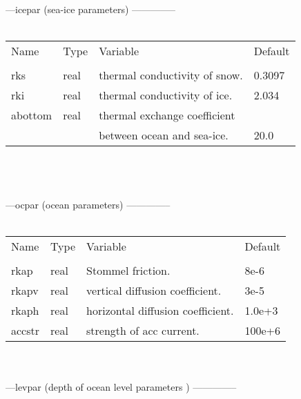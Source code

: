 \\
\\
---icepar  (sea-ice parameters) --------------\\ \
\\
\begin{tabular}{llll}
Name	&    Type  &	Variable			&		Default    \\
\\ 
\hline
rks     &    real    &	thermal conductivity of snow.   	&      0.3097 \\
rki     &    real    &	thermal conductivity of ice.     	&      2.034  \\
abottom &    real    &	thermal exchange coefficient            &             \\
        &            &  between ocean and sea-ice.              &      20.0   \\  \hline	
\end{tabular} \\
\\
\\
---ocpar  (ocean parameters) --------------\\ \
\\
\begin{tabular}{llll}
Name	&    Type  &	Variable			&		Default    \\
\\ 
\hline
rkap    &    real    &	Stommel friction.	                &      8e-6   \\	
rkapv   &    real    &	vertical diffusion coefficient.	        &      3e-5   \\	
rkaph   &    real    &	horizontal diffusion coefficient.	&      1.0e+3 \\     	
accstr  &    real    &	strength of acc current.           	&      100e+6 \\ \hline
\end{tabular} \\
\\
\newpage
---levpar  (depth of ocean level parameters ) --------------\\ \
\\
